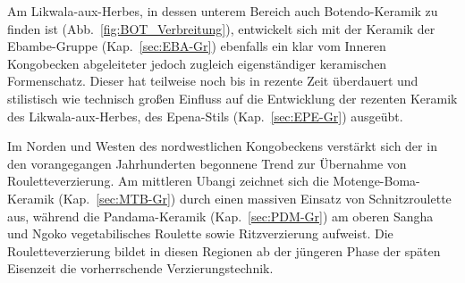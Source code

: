 Am Likwala-aux-Herbes, in dessen unterem Bereich auch Botendo-Keramik zu finden ist (Abb.~\ref{fig:BOT_Verbreitung}), entwickelt sich mit der Keramik der Ebambe-Gruppe (Kap.~\ref{sec:EBA-Gr}) ebenfalls ein klar vom Inneren Kongobecken abgeleiteter jedoch zugleich eigenständiger keramischen Formenschatz. Dieser hat teilweise noch bis in rezente Zeit überdauert und stilistisch wie technisch großen Einfluss auf die Entwicklung der rezenten Keramik des Likwala-aux-Herbes, des Epena-Stils (Kap.~\ref{sec:EPE-Gr}) ausgeübt. 

Im Norden und Westen des nordwestlichen Kongobeckens verstärkt sich der in den vorangegangen Jahrhunderten begonnene Trend zur Übernahme von Rouletteverzierung. Am mittleren \mbox{Ubangi} zeichnet sich die Motenge-Boma-Keramik (Kap.~\ref{sec:MTB-Gr}) durch einen massiven Einsatz von Schnitzroulette aus, während die Pandama-Keramik (Kap.~\ref{sec:PDM-Gr}) am oberen \mbox{Sangha} und \mbox{Ngoko} vegetabilisches \mbox{Roulette} sowie Ritzverzierung aufweist. Die Rouletteverzierung bildet in diesen Regionen ab der jüngeren Phase der späten Eisenzeit die vorherrschende Verzierungstechnik.

